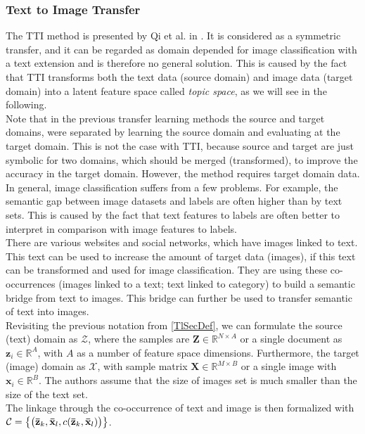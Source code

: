 \subsubsection{Text to Image Transfer}
The \acs{TTI} method is presented by Qi et al. in \cite{Qi.2011}.
It is considered as a symmetric transfer, and it can be regarded as domain depended for image classification with a text extension and is therefore no general solution.\cite[p. 22]{Weiss.2016}
This is caused by the fact that \ac{TTI} transforms both the text data (source domain) and image data (target domain) into a latent feature space called \textit{topic space}, as we will see in the following.\\
Note that in the previous transfer learning methods the source and target domains, were separated by learning the source domain and evaluating at the target domain.
This is not the case with \acs{TTI}, because source and target are just symbolic for two domains, which should be merged (transformed), to improve the accuracy in the target domain.
However, the method requires target domain data.\cite{Qi.2011}\\
In general, image classification suffers from a few problems.
For example, the semantic gap between image datasets and labels are often higher than by text sets.
This is caused by the fact that text features to labels are often better to interpret in comparison with image features to labels.\cite{Qi.2011}\\
There are various websites and social networks, which have images linked to text.
This text can be used to increase the amount of target data (images), if this text can be transformed and used for image classification.
They are using these co-occurrences (images linked to a text; text linked to category) to build a semantic bridge from text to images.
This bridge can further be used to transfer semantic of text into images.\cite{Qi.2011}\\
Revisiting the previous notation from \ref{TlSecDef}, we can formulate the source (text) domain as $\mathcal{Z}$, where the samples are $\mathbf{Z} \in \mathbb{R}^{N\times A}$ or a single document as $\mathbf{z}_i\in \mathbb{R}^A$, with $A$ as a number of feature space dimensions.
Furthermore, the target (image) domain as $\mathcal{X}$, with sample matrix $\mathbf{X} \in \mathbb{R}^{M\times B}$ or a single image with $\mathbf{x}_i\in\mathbb{R}^B$.
The authors assume that the size of images set is much smaller than the size of the text set.\cite{Qi.2011}\\
The linkage through the co-occurrence of text and image is then formalized with $\mathcal{C} = \big\{\big( \mathbf{\bar{z}}_k,\mathbf{\bar{x}}_l,c( \mathbf{\bar{z}}_k,\mathbf{\bar{x}}_l) \big)\big\}$.
